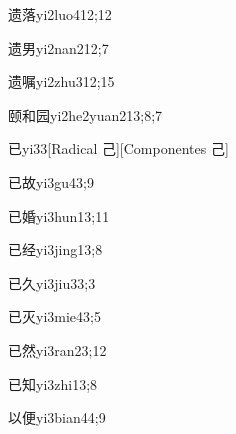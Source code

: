 \begin{verbete}{遗落}{yi2luo4}{12;12}
\end{verbete}

\begin{verbete}{遗男}{yi2nan2}{12;7}
\end{verbete}

\begin{verbete}{遗嘱}{yi2zhu3}{12;15}
\end{verbete}

\begin{verbete}{颐和园}{yi2he2yuan2}{13;8;7}
\end{verbete}

\begin{verbete}{已}{yi3}{3}[Radical 己][Componentes 己]
\end{verbete}

\begin{verbete}{已故}{yi3gu4}{3;9}
\end{verbete}

\begin{verbete}{已婚}{yi3hun1}{3;11}
\end{verbete}

\begin{verbete}{已经}{yi3jing1}{3;8}
\end{verbete}

\begin{verbete}{已久}{yi3jiu3}{3;3}
\end{verbete}

\begin{verbete}{已灭}{yi3mie4}{3;5}
\end{verbete}

\begin{verbete}{已然}{yi3ran2}{3;12}
\end{verbete}

\begin{verbete}{已知}{yi3zhi1}{3;8}
\end{verbete}

\begin{verbete}{以便}{yi3bian4}{4;9}
\end{verbete}


